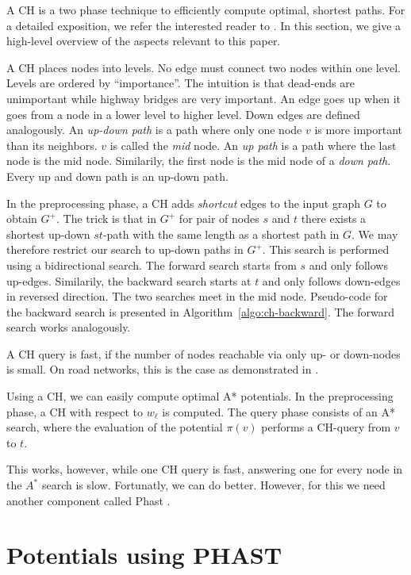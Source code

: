 \documentclass[a4paper,UKenglish,cleveref, autoref]{lipics-v2019}
\begin{document}
A CH is a two phase technique to efficiently compute optimal, shortest paths.
For a detailed exposition, we refer the interested reader to \cite{dsw-cch-15,gssv-erlrn-12}.
In this section, we give a high-level overview of the aspects relevant to this paper.

A CH places nodes into levels.
No edge must connect two nodes within one level.
Levels are ordered by ``importance''.
The intuition is that dead-ends are unimportant while highway bridges are very important.
An edge goes up when it goes from a node in a lower level to higher level.
Down edges are defined analogously.
An \emph{up-down path} is a path where only one node $v$ is more important than its neighbors.
$v$ is called the \emph{mid} node.
An \emph{up path} is a path where the last node is the mid node.
Similarily, the first node is the mid node of a \emph{down path}.
Every up and down path is an up-down path.

In the preprocessing phase, a CH adds \emph{shortcut} edges to the input graph $G$ to obtain $G^+$.
The trick is that in $G^+$ for pair of nodes $s$ and $t$ there exists a shortest up-down $st$-path with the same length as a shortest path in $G$.
We may therefore restrict our search to up-down paths in $G^+$.
This search is performed using a bidirectional search.
The forward search starts from $s$ and only follows up-edges.
Similarily, the backward search starts at $t$ and only follows down-edges in reversed direction.
The two searches meet in the mid node.
Pseudo-code for the backward search is presented in Algorithm~\ref{algo:ch-backward}.
The forward search works analogously.

A CH query is fast, if the number of nodes reachable via only up- or down-nodes is small.
On road networks, this is the case as demonstrated in \cite{gssv-erlrn-12,dgrw-gpnc-11,dgpw-crprn-13,dsw-cch-15,hs-gbpo-18}.

Using a CH, we can easily compute optimal A* potentials.
In the preprocessing phase, a CH with respect to $w_\ell$ is computed.
The query phase consists of an A* search, where the evaluation of the potential $\pi(v)$ performs a CH-query from $v$ to $t$.

This works, however, while one CH query is fast, answering one for every node in the $A^*$ search is slow.
Fortunatly, we can do better.
However, for this we need another component called Phast \cite{dgnw-phast-13}.

\section{Potentials using PHAST}
\end{document}
